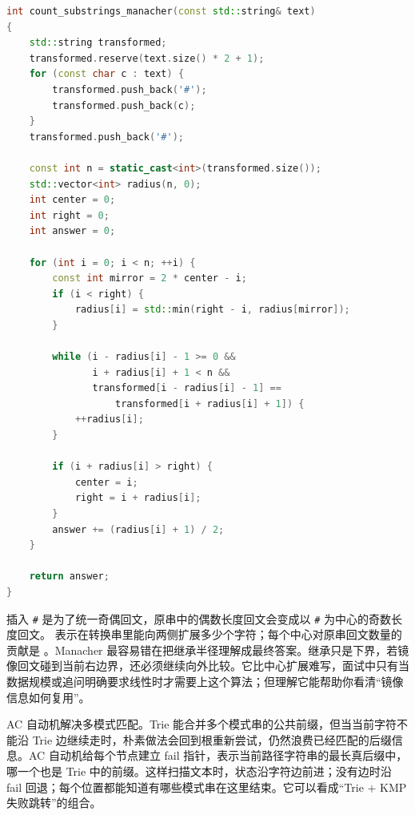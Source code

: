 \begin{lstlisting}[language=C++,caption={LeetCode 647 回文子串：Manacher 线性统计回文数量}]
int count_substrings_manacher(const std::string& text)
{
    std::string transformed;
    transformed.reserve(text.size() * 2 + 1);
    for (const char c : text) {
        transformed.push_back('#');
        transformed.push_back(c);
    }
    transformed.push_back('#');

    const int n = static_cast<int>(transformed.size());
    std::vector<int> radius(n, 0);
    int center = 0;
    int right = 0;
    int answer = 0;

    for (int i = 0; i < n; ++i) {
        const int mirror = 2 * center - i;
        if (i < right) {
            radius[i] = std::min(right - i, radius[mirror]);
        }

        while (i - radius[i] - 1 >= 0 &&
               i + radius[i] + 1 < n &&
               transformed[i - radius[i] - 1] ==
                   transformed[i + radius[i] + 1]) {
            ++radius[i];
        }

        if (i + radius[i] > right) {
            center = i;
            right = i + radius[i];
        }
        answer += (radius[i] + 1) / 2;
    }

    return answer;
}
\end{lstlisting}

插入 \texttt{\#} 是为了统一奇偶回文，原串中的偶数长度回文会变成以 \texttt{\#} 为中心的奇数长度回文。  表示在转换串里能向两侧扩展多少个字符；每个中心对原串回文数量的贡献是 。Manacher 最容易错在把继承半径理解成最终答案。继承只是下界，若镜像回文碰到当前右边界，还必须继续向外比较。它比中心扩展难写，面试中只有当数据规模或追问明确要求线性时才需要上这个算法；但理解它能帮助你看清“镜像信息如何复用”。

AC 自动机解决多模式匹配。Trie 能合并多个模式串的公共前缀，但当当前字符不能沿 Trie 边继续走时，朴素做法会回到根重新尝试，仍然浪费已经匹配的后缀信息。AC 自动机给每个节点建立 fail 指针，表示当前路径字符串的最长真后缀中，哪一个也是 Trie 中的前缀。这样扫描文本时，状态沿字符边前进；没有边时沿 fail 回退；每个位置都能知道有哪些模式串在这里结束。它可以看成“Trie + KMP 失败跳转”的组合。

